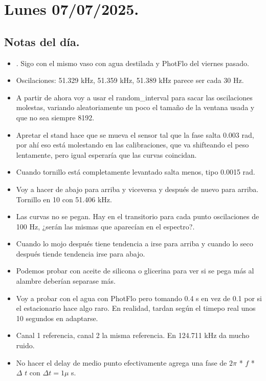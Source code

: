 \section{Lunes 07/07/2025.}

\subsection*{Notas del día.}
\begin{itemize}
	\item . Sigo con el mismo vaso con agua destilada y PhotFlo del viernes pasado. 
	\item Oscilaciones: 51.329 kHz, 51.359 kHz, 51.389 kHz parece ser cada 30 Hz. 
	
	\item A partir de ahora voy a usar el random\_interval para sacar las oscilaciones molestas, variando aleatoriamente un poco el tamaño de la ventana usada y que no sea siempre 8192. 
	\item Apretar el stand hace que se mueva el sensor tal que la fase salta 0.003 rad, por ahí eso está molestando en las calibraciones, que va shifteando el peso lentamente, pero igual esperaría que las curvas coincidan. 
	\item Cuando tornillo está completamente levantado salta menos, tipo 0.0015 rad. 
	
	\item Voy a hacer de abajo para arriba y viceversa y después de nuevo para arriba. Tornillo en 10 con 51.406 kHz.  
	\item Las curvas no se pegan. Hay en el transitorio para cada punto oscilaciones de 100 Hz, ¿serán las mismas que aparecían en el espectro?.
	
	\item Cuando lo mojo después tiene tendencia a irse para arriba y cuando lo seco después tiende tendencia irse para abajo. 
	
	\item Podemos probar con aceite de silicona o glicerina para ver si se pega más al alambre deberían separase más. 
	
	\item Voy a probar con el agua con PhotFlo pero tomando 0.4 s en vez de 0.1 por si el estacionario hace algo raro. En realidad, tardan según el timepo real unos 10 segundos en adaptarse. 
	
	\item Canal 1 referencia, canal 2 la misma referencia. En 124.711 kHz da mucho ruido. 
	\item No hacer el delay de medio punto efectivamente agrega una fase de $2\pi$ * $f$ * $\Delta$ $t$ con $\Delta t = 1\mu$ s. 
	

\end{itemize}
